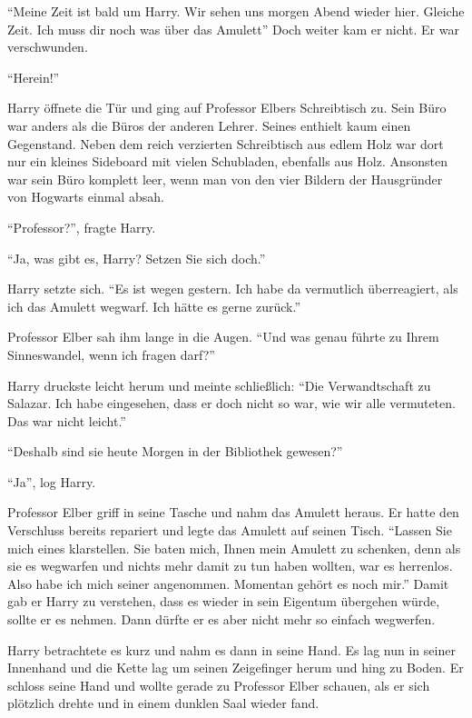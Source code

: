 \enquote{Meine Zeit ist bald um Harry. Wir sehen uns morgen Abend wieder hier. Gleiche Zeit. Ich muss dir noch was über das Amulett\gst} Doch weiter kam er nicht. Er war verschwunden.

\trenn

\enquote{Herein!}

Harry öffnete die Tür und ging auf Professor Elbers Schreibtisch zu. Sein Büro war anders als die Büros der anderen Lehrer. Seines enthielt kaum einen Gegenstand. Neben dem reich verzierten Schreibtisch aus edlem Holz war dort nur ein kleines Sideboard mit vielen Schubladen, ebenfalls aus Holz. Ansonsten war sein Büro komplett leer, wenn man von den vier Bildern der Hausgründer von Hogwarts einmal absah.

\enquote{Professor?}, fragte Harry.

\enquote{Ja, was gibt es, Harry? Setzen Sie sich doch.}

Harry setzte sich. \enquote{Es ist wegen gestern. Ich habe da vermutlich überreagiert, als ich das Amulett wegwarf. \gst Ich hätte es gerne zurück.}

Professor Elber sah ihm lange in die Augen. \enquote{Und was genau führte zu Ihrem Sinneswandel, wenn ich fragen darf?}

Harry druckste leicht herum und meinte schließlich: \enquote{Die Verwandtschaft zu Salazar. Ich habe eingesehen, dass er doch nicht so war, wie wir alle vermuteten. Das war nicht leicht.}

\enquote{Deshalb sind sie heute Morgen in der Bibliothek gewesen?}

\enquote{Ja}, log Harry.

Professor Elber griff in seine Tasche und nahm das Amulett heraus. Er hatte den Verschluss bereits repariert und legte das Amulett auf seinen Tisch. \enquote{Lassen Sie mich eines klarstellen. Sie baten mich, Ihnen mein Amulett zu schenken, denn als sie es wegwarfen und nichts mehr damit zu tun haben wollten, war es herrenlos. Also habe ich mich seiner angenommen. Momentan gehört es noch mir.} Damit gab er Harry zu verstehen, dass es wieder in sein Eigentum übergehen würde, sollte er es nehmen. Dann dürfte er es aber nicht mehr so einfach wegwerfen.

Harry betrachtete es kurz und nahm es dann in seine Hand. Es lag nun in seiner Innenhand und die Kette lag um seinen Zeigefinger herum und hing zu Boden. Er schloss seine Hand und wollte gerade zu Professor Elber schauen, als er sich plötzlich drehte und in einem dunklen Saal wieder fand.

